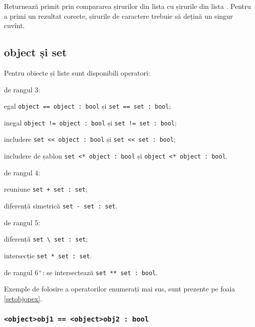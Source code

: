 Returnează primit prin compararea șirurilor din lista  cu șirurile din lista .
Pentru a primi un rezultat corecte, șirurile de caractere trebuie să dețină un singur cuvînt.

\subsection{{\color{lightblue}object} și {\color{lightblue}set}}

Pentru obiecte și liste sunt disponibili operatori:
\begin{icItems}
	\item
		de rangul 3:
		\begin{icItems}
		\item
			egal \lstinline|object == object : bool| și \lstinline|set == set : bool|;
		\item
			inegal \lstinline|object != object : bool| și \lstinline|set != set : bool|;
		\item
			includere \lstinline|set << object : bool| și \lstinline|set << set : bool|;
		\item
			includere de șablon \lstinline|set <* object : bool| și \lstinline|object <* object : bool|.
		\end{icItems}
	\item
		de rangul 4:
		\begin{icItems}
		\item
			reuniune \lstinline|set + set : set|;
		\item
			diferență simetrică \lstinline|set - set : set|.
		\end{icItems}
	\item
		de rangul 5:
		\begin{icItems}
		\item
			diferență \lstinline|set \ set : set|;
		\item
			intersecție \lstinline|set * set : set|.
		\end{icItems}
	\item
		de rangul 6$^+$: se intersectează \lstinline|set ** set : bool|.
\end{icItems}

Exemple de folosire a operatorilor enumerați mai sus, sunt prezente pe foaia \ref{setobjopex}.

\subsubsection{\lstinline|<object>obj1 == <object>obj2 : bool|}

